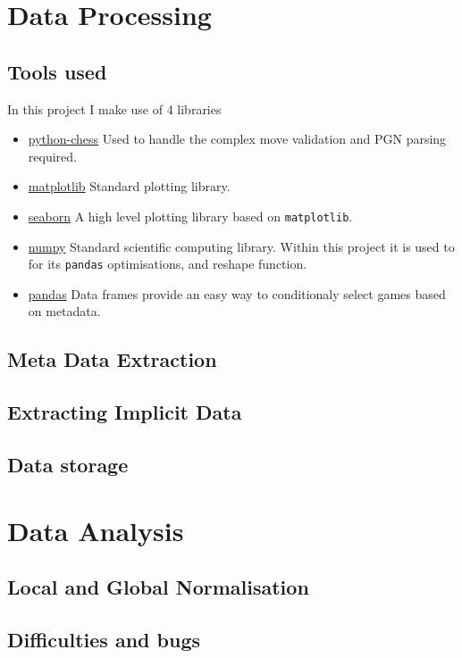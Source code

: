 \documentclass[11pt]{article}
\begin{document}
\section{Data Processing}
\label{sec:orgfb3cd5c}
\subsection{Tools used}
\label{sec:orga14c537}
In this project I make use of 4 libraries
\begin{itemize}
\item \href{https://github.com/niklasf/python-chess}{python-chess}
Used to handle the complex move validation and PGN parsing required.
\item \href{https://matplotlib.org/}{matplotlib}
Standard plotting library.
\item \href{https://seaborn.pydata.org/}{seaborn}
A high level plotting library based on \texttt{matplotlib}.
\item \href{https://numpy.org/}{numpy}
Standard scientific computing library. Within this project it is used to for its \texttt{pandas} optimisations, and reshape function.
\item \href{https://pandas.pydata.org/}{pandas}
Data frames provide an easy way to conditionaly select games based on metadata.
\end{itemize}
\subsection{Meta Data Extraction}
\label{sec:orga23aaf1}
\subsection{Extracting Implicit Data}
\label{sec:orgae539bc}
\subsection{Data storage}
\label{sec:org93e38ef}
\section{Data Analysis}
\label{sec:orgdf585be}
\subsection{Local and Global Normalisation}
\label{sec:org7e34c63}
\subsection{Difficulties and bugs}
\label{sec:org2adf2aa}
\end{document}
